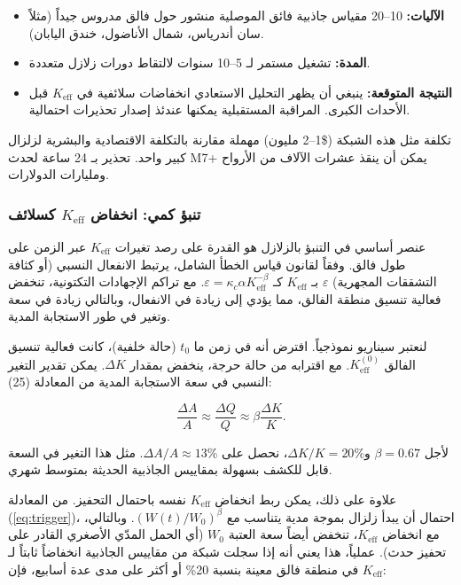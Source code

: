 \documentclass[12pt,a4paper]{article}
\theoremstyle{remark}
\begin{document}
	\begin{itemize}
		\item \textbf{الآليات:} 10–20 مقياس جاذبية فائق الموصلية منشور حول فالق مدروس جيداً (مثلاً سان أندرياس، شمال الأناضول، خندق اليابان).
		\item \textbf{المدة:} تشغيل مستمر لـ 5–10 سنوات لالتقاط دورات زلازل متعددة.
		\item \textbf{النتيجة المتوقعة:} ينبغي أن يظهر التحليل الاستعادي انخفاضات سلائفية في \(K_{\mathrm{eff}}\) قبل الأحداث الكبرى. المراقبة المستقبلية يمكنها عندئذ إصدار تحذيرات احتمالية.
	\end{itemize}
	
	تكلفة مثل هذه الشبكة (\$1–2 مليون) مهملة مقارنة بالتكلفة الاقتصادية والبشرية لزلزال كبير واحد. تحذير بـ 24 ساعة لحدث M7+ يمكن أن ينقذ عشرات الآلاف من الأرواح ومليارات الدولارات.
	
	\subsubsection{تنبؤ كمي: انخفاض \(K_{\mathrm{eff}}\) كسلائف}
	\label{subsubsec:precursor}
	
	عنصر أساسي في التنبؤ بالزلازل هو القدرة على رصد تغيرات \(K_{\mathrm{eff}}\) عبر الزمن على طول فالق. وفقاً لقانون قياس الخطأ الشامل، يرتبط الانفعال النسبي (أو كثافة التشققات المجهرية) \(\varepsilon\) بـ \(K_{\mathrm{eff}}\) كـ \(\varepsilon = \kappa_c \alpha K_{\mathrm{eff}}^{-\beta}\). مع تراكم الإجهادات التكتونية، تنخفض فعالية تنسيق منطقة الفالق، مما يؤدي إلى زيادة في الانفعال، وبالتالي زيادة في سعة وتغير في طور الاستجابة المدية.
	
	لنعتبر سيناريو نموذجياً. افترض أنه في زمن ما \(t_0\) (حالة خلفية)، كانت فعالية تنسيق الفالق \(K_{\mathrm{eff}}^{(0)}\). مع اقترابه من حالة حرجة، ينخفض بمقدار \(\Delta K\). يمكن تقدير التغير النسبي في سعة الاستجابة المدية من المعادلة (25):
	
	\[
	\frac{\Delta A}{A} \approx \frac{\Delta Q}{Q} \approx \beta \frac{\Delta K}{K}.
	\]
	
	لأجل \(\beta = 0.67\) و\(\Delta K/K = 20\%\)، نحصل على \(\Delta A/A \approx 13\%\). مثل هذا التغير في السعة قابل للكشف بسهولة بمقاييس الجاذبية الحديثة بمتوسط شهري.
	
	علاوة على ذلك، يمكن ربط انخفاض \(K_{\mathrm{eff}}\) نفسه باحتمال التحفيز. من المعادلة (\ref{eq:trigger})، احتمال أن يبدأ زلزال بموجة مدية يتناسب مع \((W(t)/W_0)^{\beta}\). وبالتالي، مع انخفاض \(K_{\mathrm{eff}}\)، تنخفض أيضاً سعة العتبة \(W_0\) (أي الحمل المدّي الأصغري القادر على تحفيز حدث). عملياً، هذا يعني أنه إذا سجلت شبكة من مقاييس الجاذبية انخفاضاً ثابتاً لـ \(K_{\mathrm{eff}}\) في منطقة فالق معينة بنسبة 20\% أو أكثر على مدى عدة أسابيع، فإن:
	
\end{document}
